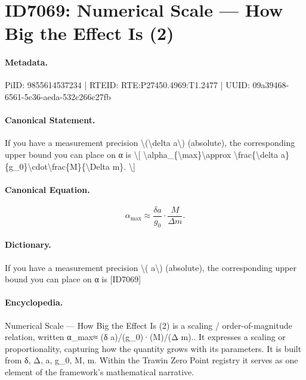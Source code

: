 \section*{ID7069: Numerical Scale — How Big the Effect Is (2)}
\paragraph{Metadata.}
PiID: 9855614537234 | RTEID: RTE:P27450.4969:T1.2477 | UUID: 09a39468-6561-5c36-aeda-532c266c27fb

\paragraph{Canonical Statement.}
If you have a measurement precision \textbackslash{}(\textbackslash{}delta a\textbackslash{}) (absolute), the corresponding upper bound you can place on α is \textbackslash{}[ \textbackslash{}alpha\_\{\textbackslash{}max\}\textbackslash{}approx \textbackslash{}frac\{\textbackslash{}delta a\}\{g\_0\}\textbackslash{}cdot\textbackslash{}frac\{M\}\{\textbackslash{}Delta m\}. \textbackslash{}]

\paragraph{Canonical Equation.}
\[
\alpha_{\max}\approx \frac{\delta a}{g_0}\cdot\frac{M}{\Delta m}.
\]

\paragraph{Dictionary.}
If you have a measurement precision \textbackslash{}( a\textbackslash{}) (absolute), the corresponding upper bound you can place on α is [ID7069]

\paragraph{Encyclopedia.}
Numerical Scale — How Big the Effect Is (2) is a scaling / order-of-magnitude relation, written α\_max≈ (δ a)/(g\_0)·(M)/(Δ m).. It expresses a scaling or proportionality, capturing how the quantity grows with its parameters. It is built from δ, Δ, a, g\_0, M, m. Within the Trawin Zero Point registry it serves as one element of the framework's mathematical narrative.
